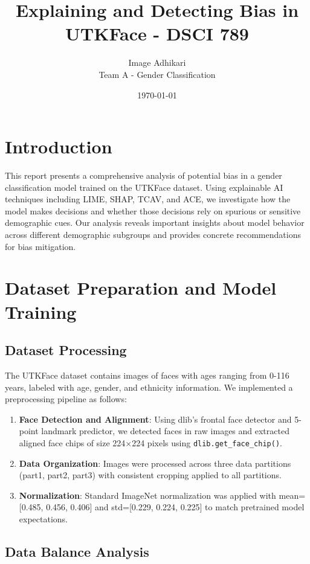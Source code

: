 \documentclass[11pt,letterpaper]{article}
\title{Explaining and Detecting Bias in UTKFace - DSCI 789}
\author{Image Adhikari \\ 
\small Team A - Gender Classification}
\date{\today}
\begin{document}
\maketitle

\section{Introduction}
This report presents a comprehensive analysis of potential bias in a gender classification model trained on the UTKFace dataset. Using explainable AI techniques including LIME, SHAP, TCAV, and ACE, we investigate how the model makes decisions and whether those decisions rely on spurious or sensitive demographic cues. Our analysis reveals important insights about model behavior across different demographic subgroups and provides concrete recommendations for bias mitigation.

\section{Dataset Preparation and Model Training}

\subsection{Dataset Processing}
The UTKFace dataset contains images of faces with ages ranging from 0-116 years, labeled with age, gender, and ethnicity information. We implemented a preprocessing pipeline as follows:

\begin{enumerate}
\item \textbf{Face Detection and Alignment}: Using dlib's frontal face detector and 5-point landmark predictor, we detected faces in raw images and extracted aligned face chips of size 224×224 pixels using \texttt{dlib.get\_face\_chip()}.
\item \textbf{Data Organization}: Images were processed across three data partitions (part1, part2, part3) with consistent cropping applied to all partitions.
\item \textbf{Normalization}: Standard ImageNet normalization was applied with mean=[0.485, 0.456, 0.406] and std=[0.229, 0.224, 0.225] to match pretrained model expectations.
\end{enumerate}


\subsection{Data Balance Analysis}
\end{document}
